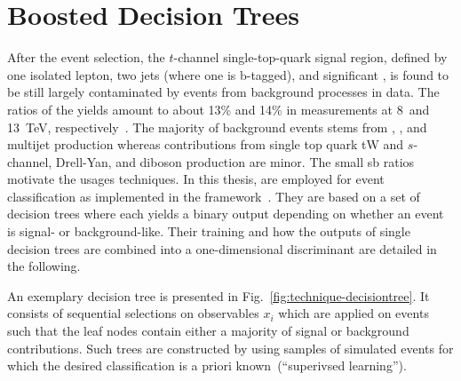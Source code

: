 \section{Boosted Decision Trees}

After the event selection, the $t$-channel single-top-quark signal region, defined by one isolated lepton, two jets (where one is b-tagged), and significant \met, is found to be still largely contaminated by events from background processes in data. The ratios of the  yields amount to about 13\% and 14\% in measurements at 8~and 13~TeV, respectively~\cite{Khachatryan:2014iya,Sirunyan:2016cdg}. The majority of background events stems from \wjets, \ttbar, and multijet production whereas contributions from single top quark tW and $s$-channel, Drell-Yan, and diboson production are minor. The small \gls{sb} ratios motivate the usages  techniques. In this thesis,  are employed for event classification as implemented in the \TMVA[] framework~\cite{Hocker:2007ht}. They are based on a set of decision trees where each yields a binary output depending on whether an event is signal- or background-like. Their training and how the outputs of single decision trees are combined into a one-dimensional discriminant are detailed in the following.

An exemplary decision tree is presented in Fig.~\ref{fig:technique-decisiontree}. It consists of sequential selections on observables $x_{i}$ which are applied on events such that the leaf nodes contain either a majority of signal or background contributions. Such trees are constructed by using samples of simulated events for which the desired classification is a priori known~(``superivsed learning'').


